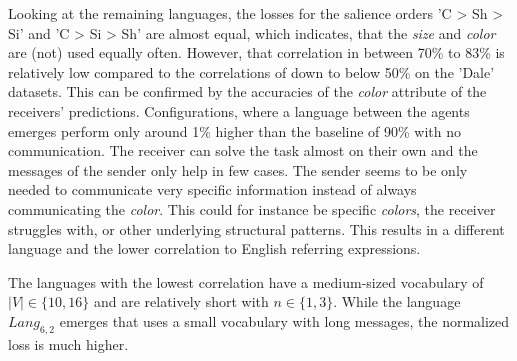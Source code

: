 Looking at the remaining languages, the losses for the salience orders 'C > Sh > Si' and 'C > Si > Sh' are almost equal, which indicates, that the \emph{size} and \emph{color} are (not) used equally often.
However, that correlation in between 70\% to 83\% is relatively low compared to the correlations of down to below 50\% on the 'Dale' datasets.
This can be confirmed by the accuracies of the \emph{color} attribute of the receivers' predictions.
Configurations, where a language between the agents emerges perform only around 1\% higher than the baseline of 90\% with no communication.
The receiver can solve the task almost on their own and the messages of the sender only help in few cases.
The sender seems to be only needed to communicate very specific information instead of always communicating the \emph{color}.
This could for instance be specific \emph{colors}, the receiver struggles with, or other underlying structural patterns.
This results in a different language and the lower correlation to English referring expressions.

The languages with the lowest correlation have a medium-sized vocabulary of $|V| \in \{10,16\}$ and are relatively short with $n \in \{1,3\}$.
While the language $Lang_{6,2}$ emerges that uses a small vocabulary with long messages, the normalized loss is much higher.